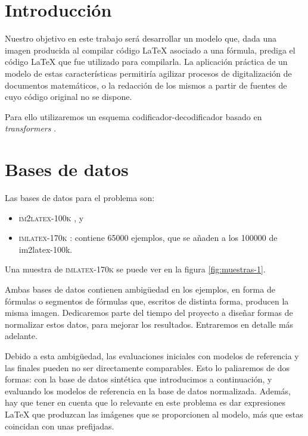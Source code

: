 \documentclass[a4paper, 20pt, dvipsnames]{article}
\begin{document}
{\parskip=2pt
	\tableofcontents
}
\pagebreak

\newpage

\section{Introducción}

Nuestro objetivo en este trabajo será desarrollar un modelo que, dada una imagen
producida al compilar código \LaTeX{} asociado a una fórmula, prediga el código
\LaTeX{} que fue utilizado para compilarla. La aplicación práctica de un modelo
de estas características permitiría agilizar procesos de digitalización de
documentos matemáticos, o la redacción de los mismos a partir de fuentes de cuyo
código original no se dispone.

Para ello utilizaremos un esquema codificador-decodificador basado en
\emph{transformers} \cite{vaswani2017attention}.


\section{Bases de datos}
\label{sec:datasets}

Las bases de datos para el problema son:

\begin{itemize}
\item
  \textsc{im2latex-100k} \cite{kanervisto_anssi_2016_56198}, y
\item
  \textsc{imlatex-170k} \cite{im2latex_170k}: contiene 65000 ejemplos, que se
  añaden a los 100000 de im2latex-100k.
\end{itemize}

Una muestra de \textsc{imlatex-170k} se puede ver en la figura
\ref{fig:muestras-1}.

Ambas bases de datos contienen ambigüedad en los ejemplos, en forma de fórmulas
o segmentos de fórmulas que, escritos de distinta forma, producen la misma
imagen. Dedicaremos parte del tiempo del proyecto a diseñar formas de normalizar
estos datos, para mejorar los resultados. Entraremos en detalle más adelante.

Debido a esta ambigüedad, las evaluaciones iniciales con modelos de referencia y
las finales pueden no ser directamente comparables. Esto lo paliaremos de dos
formas: con la base de datos sintética que introducimos a continuación, y
evaluando los modelos de referencia en la base de datos normalizada. Además, hay
que tener en cuenta que lo relevante en este problema es dar expresiones
\LaTeX{} que produzcan las imágenes que se proporcionen al modelo, más que estas
coincidan con unas prefijadas.
\end{document}
